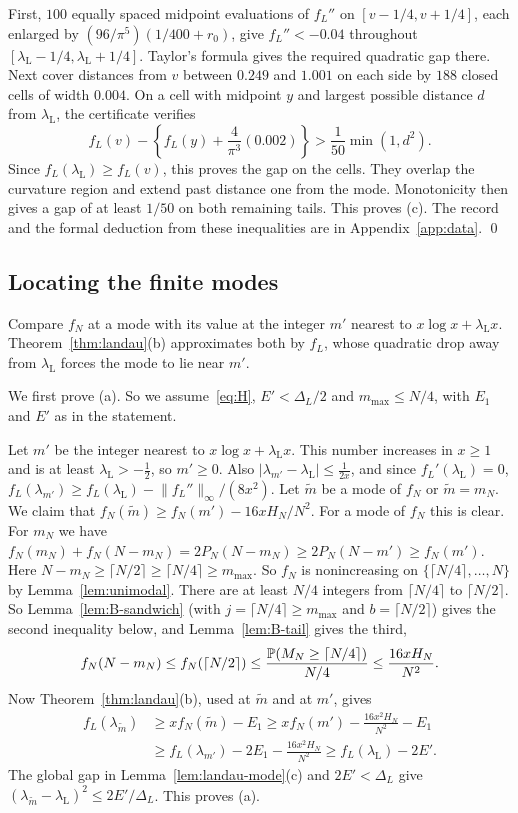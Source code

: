 First, $100$ equally spaced midpoint evaluations of $f_L''$ on
$[v-1/4,v+1/4]$, each enlarged by
$(96/\pi^5)(1/400+r_0)$, give $f_L''<-0.04$ throughout
$[\lambda_{\mathrm L}-1/4,\lambda_{\mathrm L}+1/4]$.
Taylor's formula gives the required quadratic gap there.
Next cover distances from $v$ between $0.249$ and $1.001$ on each
side by $188$ closed cells of width $0.004$. On a cell with midpoint
$y$ and largest possible distance $d$ from $\lambda_{\mathrm L}$,
the certificate verifies
\[
 f_L(v)-\left\{f_L(y)+\frac4{\pi^3}(0.002)\right\}
 >\frac1{50}\min(1,d^2).
\]
Since $f_L(\lambda_{\mathrm L})\ge f_L(v)$, this proves the gap on
the cells. They overlap the curvature region and extend past distance
one from the mode. Monotonicity then gives a gap of at least $1/50$
on both remaining tails. This proves (c). The record and the formal
deduction from these inequalities are in Appendix~\ref{app:data}. \qed

\subsection{Locating the finite modes}\label{app:bulk-cor}

Compare $f_N$ at a mode with its value at the integer $m'$ nearest to $x\log x+\lambda_{\mathrm L}x$. Theorem~\ref{thm:landau}(b) approximates both by $f_L$, whose quadratic drop away from $\lambda_{\mathrm L}$ forces the mode to lie near $m'$.

We first prove (a). So we assume~\eqref{eq:H}, $E'<\Delta_L/2$ and $m_{\max}\le N/4$, with
$E_1$ and $E'$ as in the statement.

Let $m'$ be the integer nearest to $x\log x+\lambda_{\mathrm L}x$. This number
increases in $x\ge1$ and is at least $\lambda_{\mathrm L}>-\frac12$, so $m'\ge0$. Also
$\lvert\lambda_{m'}-\lambda_{\mathrm L}\rvert\le\frac1{2x}$, and since
$f_L'(\lambda_{\mathrm L})=0$,
$f_L(\lambda_{m'})\ge f_L(\lambda_{\mathrm L})-\lVert f_L''\rVert_\infty/(8x^2)$. Let
$\tilde m$ be a mode of $f_N$ or $\tilde m=m_N$. We claim that
$f_N(\tilde m)\ge f_N(m')-16xH_N/N^2$. For a mode of $f_N$ this is clear.
For $m_N$ we have
$f_N(m_N)+f_N(N-m_N)=2P_N(N-m_N)\ge2P_N(N-m')\ge f_N(m')$. Here
$N-m_N\ge\lceil N/2\rceil\ge\lceil N/4\rceil\ge m_{\max}$. So
$f_N$ is nonincreasing on $\{\lceil N/4\rceil,\dots,N\}$ by
Lemma~\ref{lem:unimodal}. There are at least $N/4$ integers from
$\lceil N/4\rceil$ to $\lceil N/2\rceil$. So Lemma~\ref{lem:B-sandwich}
(with $j=\lceil N/4\rceil\ge m_{\max}$ and $b=\lceil N/2\rceil$) gives the second
inequality below, and Lemma~\ref{lem:B-tail} gives the third,
\[
 f_N(N-m_N)\le f_N(\lceil N/2\rceil)\le\frac{\mathbb{P}(M_N\ge\lceil N/4\rceil)}{N/4}
 \le\frac{16xH_N}{N^2}.
\]
Now Theorem~\ref{thm:landau}(b), used at $\tilde m$ and at $m'$, gives
\[
 \begin{aligned}
 f_L(\lambda_{\tilde m})&\ge xf_N(\tilde m)-E_1
 \ge xf_N(m')-\frac{16x^2H_N}{N^2}-E_1\\
 &\ge f_L(\lambda_{m'})-2E_1-\frac{16x^2H_N}{N^2}
 \ge f_L(\lambda_{\mathrm L})-2E'.
 \end{aligned}
\]
The global gap in Lemma~\ref{lem:landau-mode}(c) and $2E'<\Delta_L$
give $(\lambda_{\tilde m}-\lambda_{\mathrm L})^2\le2E'/\Delta_L$.
This proves (a).

